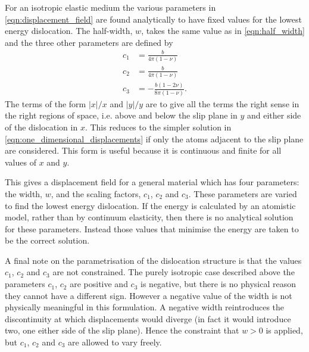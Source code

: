 For an isotropic elastic medium the various parameters in \ref{eqn:displacement_field} are found analytically  to have fixed values for the lowest energy dislocation. The half-width, $w$, takes the same value as in \autoref{eqn:half_width} and the three other parameters are defined by
\begin{subequations}\label{eqn:disloc_params}
\begin{align}
c_1 &= \frac{b}{4\pi{}(1-\nu)} \\
c_2 &= \frac{b}{4\pi{}(1-\nu)} \\
c_3 &= - \frac{b(1-2\nu)}{8\pi(1-\nu)}.
\end{align}
\label{eqn:expressions_for_the_ideal_disloca_parameters}
\end{subequations}
The terms of the form $|x|/x$ and $|y|/y$ are to give all the terms the right sense in the right regions of space, i.e. above and below the slip plane in $y$ and either side of the dislocation in $x$. This reduces to the simpler solution in \autoref{eqn:one_dimensional_displacements} if only the atoms adjacent to the slip plane are considered. This form is useful because it is continuous and finite for all values of $x$ and $y$. 


This gives a displacement field for a general material  which has four parameters: the width, $w$, and the scaling factors, $c_1$, $c_2$ and $c_3$. These parameters are varied to find the lowest energy dislocation. If the energy is calculated by an atomistic model, rather than by continuum elasticity, then there is no analytical solution for these parameters. Instead those values that minimise the energy are taken to be the correct solution.







A final note on the parametrisation of the dislocation structure is that the values $c_1$, $c_2$ and $c_3$ are not constrained. The purely isotropic case described above the parameters $c_1$, $c_2$ are positive and $c_3$ is negative, but there is no physical reason they cannot have a different sign. However a negative value of the width is not physically meaningful in this formulation. A negative width reintroduces the discontinuity at which displacements would diverge (in fact it would introduce two, one either side of the slip plane). Hence the constraint that $w>0$ is applied, but $c_1$, $c_2$ and $c_3$ are allowed to vary freely.




























